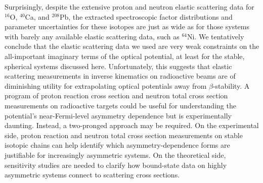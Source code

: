 \documentclass[twocolumn,secnumarabic,amssymb, nobibnotes, aps, prl,
superscriptaddress, nobalancelastpage, floatfix]{revtex4}
\newcommand{\oSix}{\ensuremath{^{16}}O}
\newcommand{\caForty}{\ensuremath{^{40}}C\lowercase{a}}
\newcommand{\niFour}{\ensuremath{^{64}}N\lowercase{i}}
\newcommand{\pbEight}{\ensuremath{^{208}}P\lowercase{b}}
\begin{document}
Surprisingly, despite the extensive proton and neutron elastic scattering data for
\oSix, \caForty, and \pbEight, the extracted spectroscopic factor distributions and parameter
uncertainties for these isotopes are just as wide as for those systems with barely any available 
elastic scattering data, such as \niFour.
We tentatively conclude that the elastic scattering data we used are very weak constraints on the 
all-important imaginary terms of the optical potential, at least for the stable, spherical systems 
discussed here. Unfortunately, this suggests that elastic scattering measurements in inverse
kinematics on radioactive beams are of diminishing utility for extrapolating optical potentials
away from $\beta$-stability. A program of proton reaction cross section
and neutron total cross section
measurements on radioactive targets could be useful for understanding the
potential's near-Fermi-level asymmetry dependence but is experimentally daunting.
Instead, a two-pronged approach may be required. On the experimental side, proton 
reaction and neutron total cross section measurements on stable isotopic chains can help identify
which asymmetry-dependence forms are justifiable for increasingly asymmetric systems.
On the theoretical side, sensitivity studies are needed
to clarify how bound-state data on highly asymmetric systems connect to scattering cross sections.
\end{document}
